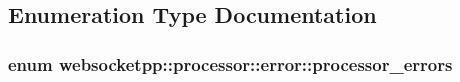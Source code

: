 \subsection{Enumeration Type Documentation}
\subsubsection[{\texorpdfstring{processor\+\_\+errors}{processor\_errors}}]{\setlength{\rightskip}{0pt plus 5cm}enum {\bf websocketpp\+::processor\+::error\+::processor\+\_\+errors}}\hypertarget{namespacewebsocketpp_1_1processor_1_1error_ae6510ada6a25dcd7af258b6e374e3ca5}{}\label{namespacewebsocketpp_1_1processor_1_1error_ae6510ada6a25dcd7af258b6e374e3ca5}
